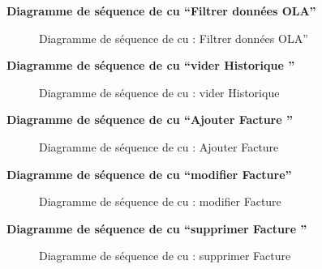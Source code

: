 \documentclass[a4paper,11pt]{report}
\begin{document}
\newpage
\textbf{ Diagramme de séquence de cu “Filtrer données OLA”}

\begin{figure}[H]
  \centering
  \setlength{\fboxrule}{1pt}
  \setlength{\fboxsep}{3pt}
  \caption{ Diagramme de séquence de cu : Filtrer données OLA”
 }
  \label{fig:clone-result}
\end{figure}

\newpage
\textbf{ Diagramme de séquence de cu “vider Historique ”}

\begin{figure}[H]
  \centering
  \setlength{\fboxrule}{1pt}
  \setlength{\fboxsep}{3pt}
  \caption{ Diagramme de séquence de cu : vider Historique 
 }
  \label{fig:clone-result}
\end{figure}

\newpage
\textbf{ Diagramme de séquence de cu “Ajouter Facture  ”}

\begin{figure}[H]
  \centering
  \setlength{\fboxrule}{1pt}
  \setlength{\fboxsep}{3pt}
  \caption{ Diagramme de séquence de cu : Ajouter Facture 
 }
  \label{fig:clone-result}
\end{figure}
\newpage
\textbf{ Diagramme de séquence de cu “modifier Facture”}

\begin{figure}[H]
  \centering
  \setlength{\fboxrule}{1pt}
  \setlength{\fboxsep}{3pt}
  \caption{ Diagramme de séquence de cu : modifier Facture
 }
  \label{fig:clone-result}
\end{figure}



\newpage
\textbf{ Diagramme de séquence de cu “supprimer Facture ”}

\begin{figure}[H]
  \centering
  \setlength{\fboxrule}{1pt}
  \setlength{\fboxsep}{3pt}
  \caption{ Diagramme de séquence de cu : supprimer Facture 
 }
  \label{fig:clone-result}
\end{figure}
\end{document}

